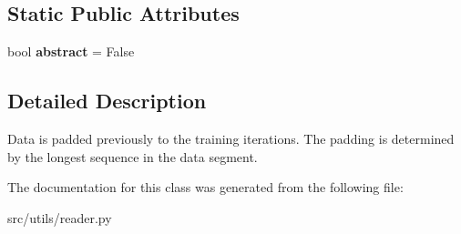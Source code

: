 \subsection*{Static Public Attributes}
\begin{DoxyCompactItemize}
\item 
bool {\bfseries abstract} = False\hypertarget{classreader_1_1PrePadding_a874531935e0148425748c2687f156691}{}\label{classreader_1_1PrePadding_a874531935e0148425748c2687f156691}

\end{DoxyCompactItemize}


\subsection{Detailed Description}
\begin{DoxyVerb}Data is padded previously to the training iterations. The padding is determined
by the longest sequence in the data segment.
\end{DoxyVerb}
 

The documentation for this class was generated from the following file\+:\begin{DoxyCompactItemize}
\item 
src/utils/reader.\+py\end{DoxyCompactItemize}
